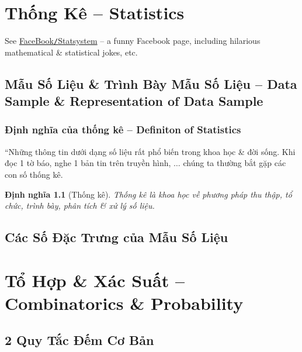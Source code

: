 \documentclass[oneside]{book}
\numberwithin{equation}{section}
\newtheorem{dinhnghia}{Định nghĩa}[section]
\begin{document}

\chapter{Thống Kê -- Statistics}

See \href{https://www.facebook.com/statsystem}{FaceBook\texttt{/}Statsystem} -- a funny Facebook page, including hilarious mathematical \& statistical jokes, etc.

\section{Mẫu Số Liệu \& Trình Bày Mẫu Số Liệu -- Data Sample \& Representation of Data Sample}

\subsection{Định nghĩa của thống kê -- Definiton of Statistics}
``Những thông tin dưới dạng số liệu rất phổ biến trong khoa học \& đời sống. Khi đọc 1 tờ báo, nghe 1 bản tin trên truyền hình, $\ldots$ chúng ta thường bắt gặp các con số thống kê.

\begin{dinhnghia}[Thống kê]
	\emph{Thống kê} là khoa học về phương pháp thu thập, tổ chức, trình bày, phân tích \& xử lý số liệu.
\end{dinhnghia}


\section{Các Số Đặc Trưng của Mẫu Số Liệu}


\chapter{Tổ Hợp \& Xác Suất -- Combinatorics \& Probability}

\section{2 Quy Tắc Đếm Cơ Bản}

\end{document}
